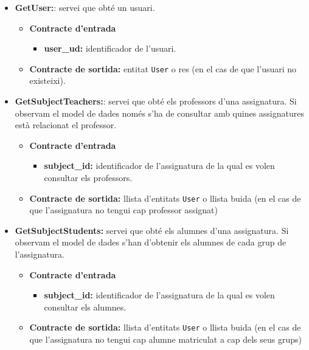 		\begin{itemize}
			\item \textbf{GetUser:}: servei que obté un usuari.
				\begin{itemize}
					\item \textbf{Contracte d'entrada}
						\begin{itemize}
							\item \textbf{user\_ud:} identificador de l'usuari.
						\end{itemize}
					\item \textbf{Contracte de sortida:} entitat \texttt{User} o res (en el cas de que l'usuari no existeixi).
				\end{itemize}
		
			\item \textbf{GetSubjectTeachers:}: servei que obté els professors d'una assignatura. Si observam el model de dades només s'ha de consultar amb quines assignatures està relacionat el professor.
				\begin{itemize}
					\item \textbf{Contracte d'entrada}
						\begin{itemize}
							\item \textbf{subject\_id:} identificador de l'assignatura de la qual es volen consultar els professors.
						\end{itemize}
					\item \textbf{Contracte de sortida:} llista d'entitats \texttt{User} o llista buida (en el cas de que l'assignatura no tengui cap professor assignat)
				\end{itemize}
			
			\item \textbf{GetSubjectStudents:} servei que obté els alumnes d'una assignatura. Si observam el model de dades s'han d'obtenir els alumnes de cada grup de l'assignatura.
				\begin{itemize}
					\item \textbf{Contracte d'entrada}
						\begin{itemize}
							\item \textbf{subject\_id:} identificador de l'assignatura de la qual es volen consultar els alumnes.
						\end{itemize}
					\item \textbf{Contracte de sortida:} llista d'entitats \texttt{User} o llista buida (en el cas de que l'assignatura no tengui cap alumne matriculat a cap dels seus grups)
				\end{itemize}
				

\end{itemize}
